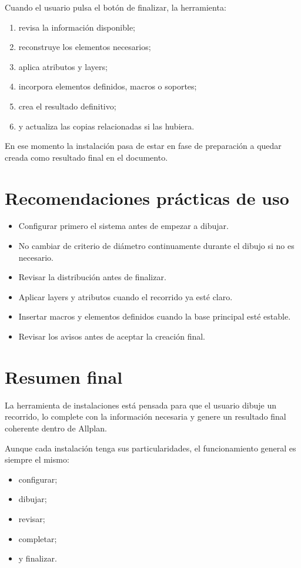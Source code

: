 \documentclass[12pt,a4paper]{article}
\begin{document}
Cuando el usuario pulsa el botón de finalizar, la herramienta:

\begin{enumerate}
\item revisa la información disponible;
\item reconstruye los elementos necesarios;
\item aplica atributos y layers;
\item incorpora elementos definidos, macros o soportes;
\item crea el resultado definitivo;
\item y actualiza las copias relacionadas si las hubiera.
\end{enumerate}

En ese momento la instalación pasa de estar en fase de preparación a quedar creada como resultado final en el documento.

\section{Recomendaciones prácticas de uso}

\begin{itemize}
\item Configurar primero el sistema antes de empezar a dibujar.
\item No cambiar de criterio de diámetro continuamente durante el dibujo si no es necesario.
\item Revisar la distribución antes de finalizar.
\item Aplicar layers y atributos cuando el recorrido ya esté claro.
\item Insertar macros y elementos definidos cuando la base principal esté estable.
\item Revisar los avisos antes de aceptar la creación final.
\end{itemize}

\section{Resumen final}

La herramienta de instalaciones está pensada para que el usuario dibuje un recorrido, lo complete con la información necesaria y genere un resultado final coherente dentro de Allplan.

Aunque cada instalación tenga sus particularidades, el funcionamiento general es siempre el mismo:

\begin{itemize}
\item configurar;
\item dibujar;
\item revisar;
\item completar;
\item y finalizar.
\end{itemize}
\end{document}
